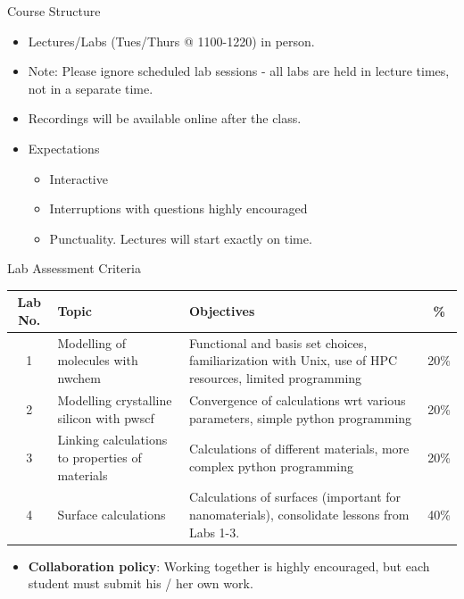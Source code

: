\documentclass[aspectratio=169]{beamer}
\begin{document}
    \begin{frame}{Course Structure}
        \begin{itemize}
            \item Lectures/Labs (Tues/Thurs @ 1100-1220) in person.
            \item Note: Please ignore scheduled lab sessions - all labs are held in lecture times, not in a separate time.
            \item Recordings will be available online after the class.
            \item Expectations
            \begin{itemize}
                \item Interactive
                \item Interruptions with questions highly encouraged
                \item Punctuality. Lectures will start exactly on time.
            \end{itemize}
        \end{itemize}
    \end{frame}


    \begin{frame}{Lab Assessment Criteria}
        \begin{table}[]
            \centering
            \footnotesize
            \begin{tabular}{|c|m{4cm}|p{6cm}|c|}
                \hline
                Lab No. & Topic & Objectives & \% \\
                \hline
                1 & Modelling of molecules with nwchem & Functional and basis set choices, familiarization with Unix, use of HPC resources, limited programming
                & 20\%\\
                2 & Modelling crystalline silicon with pwscf &
                Convergence of calculations wrt various parameters, simple python programming
                &
                20\% \\
                3 & Linking calculations to properties of materials & Calculations of different materials, more complex python programming
                & 20\%\\
                4 & Surface calculations & Calculations of surfaces (important for nanomaterials), consolidate lessons from Labs 1-3.
                & 40\%\\
                \hline
            \end{tabular}
        \end{table}
        \begin{itemize}
            \item \textbf{Collaboration policy}: Working together is highly encouraged, but each student must submit his / her own work.
        \end{itemize}
    \end{frame}
\end{document}
